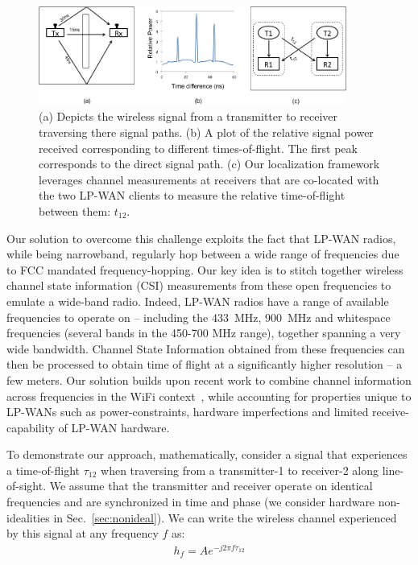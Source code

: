 \begin{figure}[!htb]
\centering
\includegraphics[width=0.9\textwidth]{figures/experiment.jpg}
\compactimg
\caption{(a) Depicts the wireless signal from a transmitter to receiver traversing there signal paths. (b) A plot of the relative signal power received corresponding to different times-of-flight. The first peak corresponds to the direct signal path. (c) Our localization framework leverages channel measurements at receivers that are co-located with the two LP-WAN clients to measure the relative time-of-flight between them: $t_{12}$.}
\label{fig:localize}
\end{figure}

Our solution to overcome this challenge exploits the fact that LP-WAN radios, while being narrowband, regularly hop between a wide range of frequencies due to FCC mandated frequency-hopping. Our key idea is to stitch together wireless channel state information (CSI) measurements from these open frequencies to emulate a wide-band radio. Indeed, LP-WAN radios have a range of available frequencies to operate on -- including the 433~MHz, 900~MHz and whitespace frequencies (several bands in the 450-700 MHz range), together spanning a very wide bandwidth. Channel State Information obtained from these frequencies can then be processed to obtain time of flight at  a significantly higher resolution -- a few meters. Our solution builds upon recent work to combine channel information across frequencies in the WiFi context~\cite{vasisht2016decimeter}, while accounting for properties unique to LP-WANs such as power-constraints, hardware imperfections and limited receive-capability of LP-WAN hardware. 

To demonstrate our approach, mathematically, consider a signal that experiences a time-of-flight $\tau_{12}$ when traversing from a transmitter-1 to receiver-2 along line-of-sight. We assume that the transmitter and receiver operate on identical frequencies and are synchronized in time and phase (we consider hardware non-idealities in Sec.~\ref{sec:nonideal}). We can write the wireless channel experienced by this signal at any frequency $f$ as:
\begin{align}
h_f = A e^{-j 2 \pi f \tau_{12}}
\end{align}

